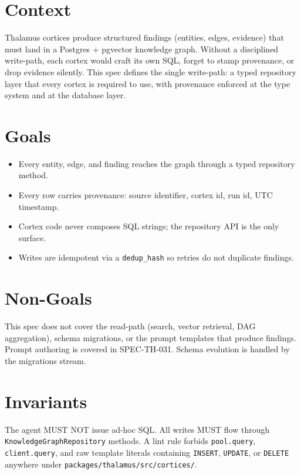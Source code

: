 




\makespecheader

\section{Context}
Thalamus cortices produce structured findings (entities, edges, evidence) that must land in
a Postgres + pgvector knowledge graph. Without a disciplined write-path, each cortex would
craft its own SQL, forget to stamp provenance, or drop evidence silently. This spec defines
the single write-path: a typed repository layer that every cortex is required to use, with
provenance enforced at the type system and at the database layer.

\section{Goals}
\begin{itemize}[leftmargin=1.2em]
  \item Every entity, edge, and finding reaches the graph through a typed repository method.
  \item Every row carries provenance: source identifier, cortex id, run id, UTC timestamp.
  \item Cortex code never composes SQL strings; the repository API is the only surface.
  \item Writes are idempotent via a \texttt{dedup\_hash} so retries do not duplicate findings.
\end{itemize}

\section{Non-Goals}
\begin{nongoal}
This spec does not cover the read-path (search, vector retrieval, DAG aggregation), schema
migrations, or the prompt templates that produce findings. Prompt authoring is covered in
SPEC-TH-031. Schema evolution is handled by the migrations stream.
\end{nongoal}

\section{Invariants}
\begin{invariant}
The agent MUST NOT issue ad-hoc SQL. All writes MUST flow through
\texttt{KnowledgeGraphRepository} methods. A lint rule forbids \texttt{pool.query},
\texttt{client.query}, and raw template literals containing \texttt{INSERT}, \texttt{UPDATE},
or \texttt{DELETE} anywhere under \texttt{packages/thalamus/src/cortices/}.
\end{invariant}

